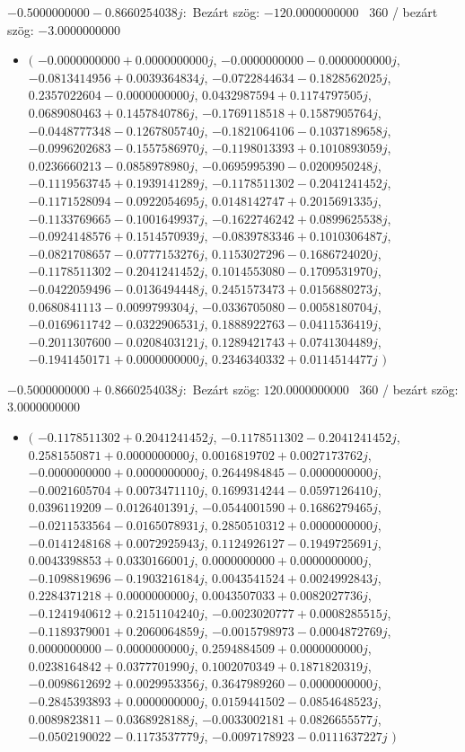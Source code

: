 \documentclass[14pt,a4paper]{article}
\begin{document}
$-0.5000000000-0.8660254038j$:\
Bezárt szög: $-120.0000000000$ \
360 / bezárt szög: $-3.0000000000$\
\begin{itemize}
\item
$\big($
$-0.0000000000+0.0000000000j$, $-0.0000000000-0.0000000000j$, $-0.0813414956+0.0039364834j$, $-0.0722844634-0.1828562025j$, $0.2357022604-0.0000000000j$, $0.0432987594+0.1174797505j$, $0.0689080463+0.1457840786j$, $-0.1769118518+0.1587905764j$, $-0.0448777348-0.1267805740j$, $-0.1821064106-0.1037189658j$, $-0.0996202683-0.1557586970j$, $-0.1198013393+0.1010893059j$, $0.0236660213-0.0858978980j$, $-0.0695995390-0.0200950248j$, $-0.1119563745+0.1939141289j$, $-0.1178511302-0.2041241452j$, $-0.1171528094-0.0922054695j$, $0.0148142747+0.2015691335j$, $-0.1133769665-0.1001649937j$, $-0.1622746242+0.0899625538j$, $-0.0924148576+0.1514570939j$, $-0.0839783346+0.1010306487j$, $-0.0821708657-0.0777153276j$, $0.1153027296-0.1686724020j$, $-0.1178511302-0.2041241452j$, $0.1014553080-0.1709531970j$, $-0.0422059496-0.0136494448j$, $0.2451573473+0.0156880273j$, $0.0680841113-0.0099799304j$, $-0.0336705080-0.0058180704j$, $-0.0169611742-0.0322906531j$, $0.1888922763-0.0411536419j$, $-0.2011307600-0.0208403121j$, $0.1289421743+0.0741304489j$, $-0.1941450171+0.0000000000j$, $0.2346340332+0.0114514477j$
$\big)$
\end{itemize}
$-0.5000000000+0.8660254038j$:\
Bezárt szög: $120.0000000000$ \
360 / bezárt szög: $3.0000000000$\
\begin{itemize}
\item
$\big($
$-0.1178511302+0.2041241452j$, $-0.1178511302-0.2041241452j$, $0.2581550871+0.0000000000j$, $0.0016819702+0.0027173762j$, $-0.0000000000+0.0000000000j$, $0.2644984845-0.0000000000j$, $-0.0021605704+0.0073471110j$, $0.1699314244-0.0597126410j$, $0.0396119209-0.0126401391j$, $-0.0544001590+0.1686279465j$, $-0.0211533564-0.0165078931j$, $0.2850510312+0.0000000000j$, $-0.0141248168+0.0072925943j$, $0.1124926127-0.1949725691j$, $0.0043398853+0.0330166001j$, $0.0000000000+0.0000000000j$, $-0.1098819696-0.1903216184j$, $0.0043541524+0.0024992843j$, $0.2284371218+0.0000000000j$, $0.0043507033+0.0082027736j$, $-0.1241940612+0.2151104240j$, $-0.0023020777+0.0008285515j$, $-0.1189379001+0.2060064859j$, $-0.0015798973-0.0004872769j$, $0.0000000000-0.0000000000j$, $0.2594884509+0.0000000000j$, $0.0238164842+0.0377701990j$, $0.1002070349+0.1871820319j$, $-0.0098612692+0.0029953356j$, $0.3647989260-0.0000000000j$, $-0.2845393893+0.0000000000j$, $0.0159441502-0.0854648523j$, $0.0089823811-0.0368928188j$, $-0.0033002181+0.0826655577j$, $-0.0502190022-0.1173537779j$, $-0.0097178923-0.0111637227j$
$\big)$
\end{itemize}
\end{document}
